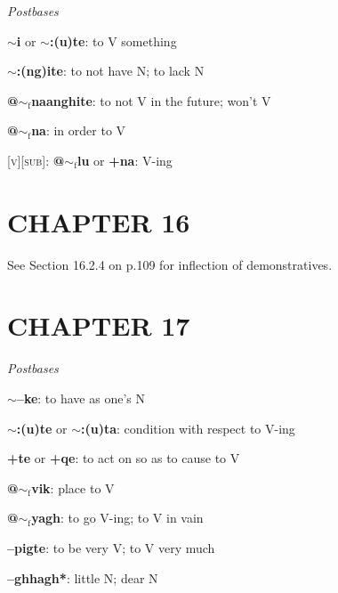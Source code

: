 \documentclass{article}
\begin{document}
\textit{Postbases}
\begin{description}
\item \textbf{$\sim$i} or \textbf{$\sim$:(u)te}: to V something
\item \textbf{$\sim$:(ng)ite}: to not have N; to lack N
\item \textbf{@$\sim_\text{f}$naanghite}: to not V in the future; won't V
\item \textbf{@$\sim_\text{f}$na}: in order to V
\end{description}

\bigskip

\textsc{[v][sub]}: \textbf{@$\sim_\text{f}$lu} or \textbf{+na}: V-ing


\section{CHAPTER 16}

See Section 16.2.4 on p.109 for inflection of demonstratives.


\section{CHAPTER 17}

\textit{Postbases}
\begin{description}
\item \textbf{$\sim$--ke}: to have as one's N
\item \textbf{$\sim$:(u)te} or \textbf{$\sim$:(u)ta}: condition with respect to V-ing
\item \textbf{+te} or \textbf{+qe}: to act on so as to cause to V
\item \textbf{@$\sim_\text{f}$vik}: place to V
\item \textbf{@$\sim_\text{f}$yagh}: to go V-ing; to V in vain
\item \textbf{--pigte}: to be very V; to V very much
\item \textbf{--ghhagh*}: little N; dear N
\end{description}
\end{document}
